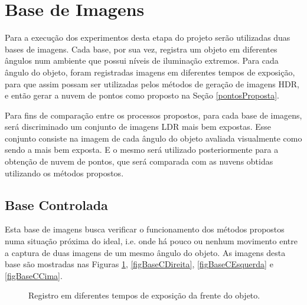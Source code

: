 \section{Base de Imagens} \label{pontosBaseImg}

Para a execução dos experimentos desta etapa do projeto serão utilizadas duas bases de imagens. Cada base, por sua vez, registra um objeto em diferentes ângulos num ambiente que possui níveis de iluminação extremos. Para cada ângulo do objeto, foram registradas imagens em diferentes tempos de exposição, para que assim possam ser utilizadas pelos métodos de geração de imagens HDR, e então gerar a nuvem de pontos como proposto na Seção \ref{pontosProposta}.

Para fins de comparação entre os processos propostos, para cada base de imagens, será discriminado um conjunto de imagens LDR mais bem expostas. Esse conjunto consiste na imagem de cada ângulo do objeto avaliada visualmente como sendo a mais bem exposta. E o mesmo será utilizado posteriormente para a obtenção de nuvem de pontos, que será comparada com as nuvens obtidas utilizando os métodos propostos.

\subsection{Base Controlada} \label{pontosBControl}
Esta base de imagens busca verificar o funcionamento dos métodos propostos numa situação próxima do ideal, i.e. onde há pouco ou nenhum movimento entre a captura de duas imagens de um mesmo ângulo do objeto. As imagens desta base são mostradas nas Figuras \ref{figBaseCFrente}, \ref{figBaseCDireita}, \ref{figBaseCEsquerda} e \ref{figBaseCCima}.

\begin{figure}[H]
  \centering 
  \quad %
  \quad %
  \quad %
  \caption{Registro em diferentes tempos de exposição da frente do objeto.}
  \label{figBaseCFrente}
\end{figure}

